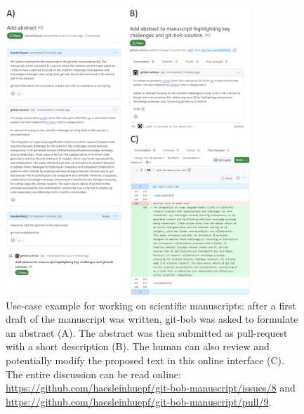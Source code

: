 \documentclass{ecai}
\begin{document}
\begin{figure}[h]
\centering
\includegraphics[width=0.82\textwidth]{example_abstract_generation.png}
\caption{Use-case example for working on scientific manuscripts: after a first draft of the manuscript was written, git-bob was asked to formulate an abstract (A). The abstract was then submitted as pull-request with a short description (B). The human can also review and potentially modify the proposed text in this online interface (C). The entire discussion can be read online: \url{https://github.com/haesleinhuepf/git-bob-manuscript/issues/8} and \url{https://github.com/haesleinhuepf/git-bob-manuscript/pull/9}.
\newline
\newline
}
\label{fig:xample_abstract_generation}
\end{figure}
\end{document}
